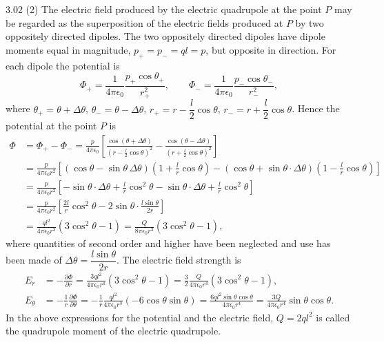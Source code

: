 \begin{solution}{3.02}
(2) The electric field produced by the electric quadrupole at the point $P$ may be regarded as the superposition of the electric fields produced at $P$ by two oppositely directed dipoles. The two oppositely directed dipoles have dipole moments equal in magnitude, $p_+=p_-=ql=p$, but opposite in direction. For each dipole the potential is
\[
\Phi_+=\frac{1}{4\pi\epsilon_0}\frac{p_+\cos\theta_+}{r_+^2},
\qquad
\Phi_-=\frac{1}{4\pi\epsilon_0}\frac{p_-\cos\theta_-}{r_-^2},
\]
where $\theta_+=\theta+\Delta\theta$, $\theta_-=\theta-\Delta\theta$, $r_+=r-\dfrac{l}{2}\cos\theta$, $r_-=r+\dfrac{l}{2}\cos\theta$. Hence the potential at the point $P$ is
\begin{align*}
\Phi&=\Phi_+-\Phi_-
=\frac{p}{4\pi\epsilon_0}\left[\frac{\cos(\theta+\Delta\theta)}{\left(r-\frac{l}{2}\cos\theta\right)^2}
-\frac{\cos(\theta-\Delta\theta)}{\left(r+\frac{l}{2}\cos\theta\right)^2}\right]\\
&=\frac{p}{4\pi\epsilon_0r^2}\left[(\cos\theta-\sin\theta\,\Delta\theta)\left(1+\frac{l}{r}\cos\theta\right)
-(\cos\theta+\sin\theta\cdot\Delta\theta)\left(1-\frac{l}{r}\cos\theta\right)\right]\\
&=\frac{p}{4\pi\epsilon_0r^2}\left[-\sin\theta\cdot\Delta\theta+\frac{l}{r}\cos^2\theta
-\sin\theta\cdot\Delta\theta+\frac{l}{r}\cos^2\theta\right]\\
&=\frac{p}{4\pi\epsilon_0r^2}\left[\frac{2l}{r}\cos^2\theta-2\sin\theta\cdot\frac{l\sin\theta}{2r}\right]\\
&=\frac{ql^2}{4\pi\epsilon_0r^3}(3\cos^2\theta-1)
=\frac{Q}{8\pi\epsilon_0r^3}(3\cos^2\theta-1),
\end{align*}
where quantities of second order and higher have been neglected and use has been made of $\Delta\theta=\dfrac{l\sin\theta}{2r}$. The electric field strength is
\begin{align*}
E_r&=-\frac{\partial\Phi}{\partial r}=\frac{3ql^2}{4\pi\epsilon_0r^4}(3\cos^2\theta-1)
=\frac{3}{2}\frac{Q}{4\pi\epsilon_0r^4}(3\cos^2\theta-1),\\
E_\theta&=-\frac{1}{r}\frac{\partial\Phi}{\partial\theta}
=-\frac{1}{r}\frac{ql^2}{4\pi\epsilon_0r^3}(-6\cos\theta\sin\theta)
=\frac{6ql^2\sin\theta\cos\theta}{4\pi\epsilon_0r^4}
=\frac{3Q}{4\pi\epsilon_0r^4}\sin\theta\cos\theta.
\end{align*}
In the above expressions for the potential and the electric field, $Q=2ql^2$ is called the quadrupole moment of the electric quadrupole.


\end{solution}
